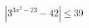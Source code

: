 \begin{ex}
	\begin{condition}
	\( |3^{3x^2-23}-42|\leq39 \)
	\end{condition}
	\answer{\( [-3;-2\sqrt{2}]\cup[2\sqrt{2};3] \)}
\end{ex}